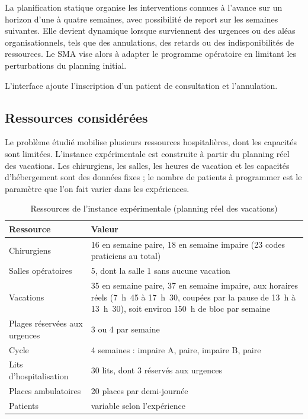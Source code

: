 \documentclass[11pt,a4paper]{article}
\begin{document}
La planification statique organise les interventions connues à l'avance sur un horizon d'une à quatre semaines, avec possibilité de report sur les semaines suivantes. Elle devient dynamique lorsque surviennent des urgences ou des aléas organisationnels, tels que des annulations, des retards ou des indisponibilités de ressources. Le SMA vise alors à adapter le programme opératoire en limitant les perturbations du planning initial.

L'interface ajoute l'inscription d'un patient de consultation et l'annulation.



\subsection{Ressources considérées}

Le problème étudié mobilise plusieurs ressources hospitalières, dont les capacités sont limitées. L'instance expérimentale est construite à partir du planning réel des vacations. Les chirurgiens, les salles, les heures de vacation et les capacités d'hébergement sont des données fixes ; le nombre de patients à programmer est le paramètre que l'on fait varier dans les expériences.

\begin{table}[htbp]
\centering
\footnotesize
\caption{Ressources de l'instance expérimentale (planning réel des vacations)}
\label{tab:ressources}
\begin{tabularx}{\linewidth}{@{}p{3.2cm}X@{}}
\toprule
\textbf{Ressource} & \textbf{Valeur} \\
\midrule
Chirurgiens & 16 en semaine paire, 18 en semaine impaire (23 codes praticiens au total) \\
Salles opératoires & 5, dont la salle 1 sans aucune vacation \\
Vacations & 35 en semaine paire, 37 en semaine impaire, aux horaires réels (7~h~45 à 17~h~30, coupées par la pause de 13~h à 13~h~30), soit environ 150~h de bloc par semaine \\
Plages réservées aux urgences & 3 ou 4 par semaine \\
Cycle & 4 semaines : impaire A, paire, impaire B, paire \\
Lits d'hospitalisation & 30 lits, dont 3 réservés aux urgences \\
Places ambulatoires & 20 places par demi-journée\\
Patients & variable selon l'expérience \\
\bottomrule
\end{tabularx}
\end{table}
\end{document}
